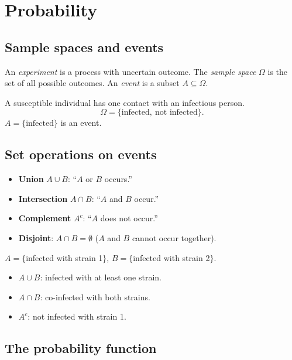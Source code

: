 \chapter{Probability}

\section{Sample spaces and events}

\begin{definition}
An \emph{experiment} is a process with uncertain outcome. The
\emph{sample space} $\Omega$ is the set of all possible outcomes. An
\emph{event} is a subset $A\subseteq\Omega$.
\end{definition}

\begin{example}
A susceptible individual has one contact with an infectious person.
\[
\Omega=\{\text{infected},\ \text{not infected}\}.
\]
$A=\{\text{infected}\}$ is an event.
\end{example}

\section{Set operations on events}

\begin{itemize}
  \item \textbf{Union} $A\cup B$: ``$A$ or $B$ occurs.''
  \item \textbf{Intersection} $A\cap B$: ``$A$ and $B$ occur.''
  \item \textbf{Complement} $A^c$: ``$A$ does not occur.''
  \item \textbf{Disjoint}: $A\cap B=\emptyset$ ($A$ and $B$ cannot occur together).
\end{itemize}

\begin{example}
$A=\{$infected with strain 1$\}$, $B=\{$infected with strain 2$\}$.
\begin{itemize}[nosep]
  \item $A\cup B$: infected with at least one strain.
  \item $A\cap B$: co-infected with both strains.
  \item $A^c$: not infected with strain 1.
\end{itemize}
\end{example}

\section{The probability function}

